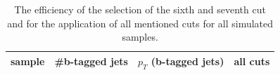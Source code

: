 \begin{table}[H]
  \centering
  \caption{The efficiency of the selection of the sixth and seventh cut and for the application of all mentioned cuts for all simulated samples.}
  \begin{tabular}{l|lll}
      sample           & \#b-tagged jets  & $p_T$ (b-tagged jets) & all cuts \\
      \hline

\end{tabular}
\end{table}
